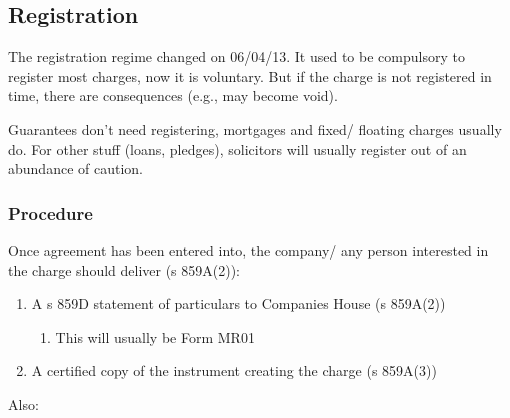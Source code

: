 \documentclass[
]{article}
\providecommand{\tightlist}{%
  \setlength{\itemsep}{0pt}\setlength{\parskip}{0pt}}
\begin{document}
\hypertarget{registration}{%
\subsection{Registration}\label{registration}}

The registration regime changed on 06/04/13. It used to be compulsory to
register most charges, now it is voluntary. But if the charge is not
registered in time, there are consequences (e.g., may become void).

Guarantees don't need registering, mortgages and fixed/ floating charges
usually do. For other stuff (loans, pledges), solicitors will usually
register out of an abundance of caution.

\hypertarget{procedure-3}{%
\subsubsection{Procedure}\label{procedure-3}}

Once agreement has been entered into, the company/ any person interested
in the charge should deliver (s 859A(2)):

\begin{enumerate}
\def\labelenumi{\arabic{enumi}.}
\tightlist
\item
  A s 859D statement of particulars to Companies House (s 859A(2))

  \begin{enumerate}
  \def\labelenumii{\arabic{enumii}.}
  \tightlist
  \item
    This will usually be Form MR01
  \end{enumerate}
\item
  A certified copy of the instrument creating the charge (s 859A(3))
\end{enumerate}

Also:
\end{document}
